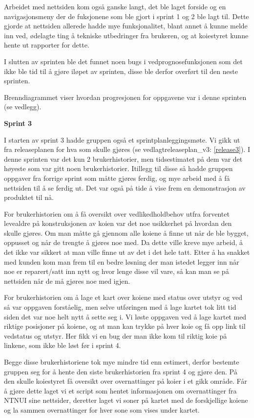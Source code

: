 \documentclass[12pt,a4paper,norsk]{article}
\begin{document}
Arbeidet med nettsiden kom også ganske langt, det ble laget forside og en navigasjonsmeny der de fuksjonene som ble gjort i sprint 1 og 2 ble lagt til. Dette gjorde at nettsiden allerede hadde mye funksjonalitet, blant annet å kunne melde inn ved, ødelagte ting å tekniske utbedringer fra brukeren, og at koiestyret kunne hente ut rapporter for dette. 

I slutten av sprinten ble det funnet noen bugs i vedprognosefunksjonen som det ikke ble tid til å gjøre iløpet av sprinten, disse ble derfor overført til den neste sprinten.

Brenndiagrammet viser hvordan progresjonen for oppgavene var i denne sprinten (se vedlegg).

\bigskip \noindent \textbf{Sprint 3}
\par I starten av sprint 3 hadde gruppen også et sprintplanleggingsmøte. Vi gikk ut fra releaseplanen for hva som skulle gjøres (se vedlagtreleaseplan_v3: \ref{release3}). I denne sprinten var det kun 2 brukerhistorier, men tidsestimatet på dem var det høyeste som var gitt noen brukerhistorier. Itillegg til disse så hadde gruppen oppgaver fra forrige sprint som måtte gjøres ferdig, og mye arbeid med å få nettsiden til å se ferdig ut. Det var også på tide å vise frem en demonstrasjon av produktet til nå. 

For brukerhistorien om å få oversikt over vedlikedholdbehov utfra forventet levealdre på konstruksjonen av koien var det noe usikkerhet på hvordan den skulle gjøres. Om man måtte gå gjennom alle koiene å finne ut når de ble bygget, oppusset og når de trengte å gjøres noe med. Da dette ville kreve mye arbeid, å det ikke var sikkert at man ville finne ut av det i det hele tatt. Etter å ha snakket med kunden kom man frem til en bedre løsning der man istedet legger inn når noe er reparert/satt inn nytt og hvor lenge disse vil vare, så kan man se på nettsiden når de må gjøres noe med igjen. 

For brukerhistorien om å lage et kart over koiene med status over utstyr og ved så var oppgaven forståelig, men selve utføringen med å lage kartet tok litt tid siden det var noe helt nytt å sette seg i. Vi løste oppgaven ved å lage kartet med riktige posisjoner på koiene, og at man kan trykke på hver koie og få opp link til vedstatus og utstyr. Her fikk vi en bug der man ikke kom til riktig koie på linkene, som ikke ble løst før i sprint 4.   

Begge disse brukerhistoriene tok mye mindre tid enn estimert, derfor bestemte gruppen seg for å hente den siste brukerhistorien fra sprint 4 og gjøre den. På den skulle koiestyret få oversikt over overnattinger på koier i et gikk område. Får å gjøre dette laget vi et script som hentet informasjonen om overnattinger fra NTNUI sine nettsider, deretter laget vi soner på kartet med de forskjellige koiene og la sammen overnattinger for hver sone som vises under kartet. 
\end{document}
